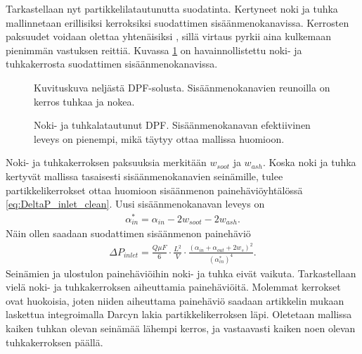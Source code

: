 Tarkastellaan nyt partikkelilatautunutta suodatinta.
Kertyneet noki ja tuhka mallinnetaan erillisiksi kerroksiksi suodattimen sisäänmenokanavissa. Kerrosten paksuudet voidaan  olettaa yhtenäisiksi \cite{Konstandopoulos2000}, sillä virtaus pyrkii aina kulkemaan pienimmän vastuksen reittiä. Kuvassa \ref{fig:hac_dpf_loaded} on havainnollistettu noki- ja tuhkakerrosta suodattimen sisäänmenokanavissa.
\begin{figure}[H]
    \centering 
               {Kuvituskuva neljästä DPF-solusta. Sisäänmenokanavien reunoilla on kerros tuhkaa ja nokea.}
    \caption{Noki- ja tuhkalatautunut DPF. Sisäänmenokanavan efektiivinen leveys on pienempi, mikä täytyy ottaa mallissa huomioon.}
    \label{fig:hac_dpf_loaded}
\end{figure}
Noki- ja tuhkakerroksen paksuuksia merkitään \(w_{soot}\) ja \(w_{ash}\).
Koska noki ja tuhka kertyvät mallissa tasaisesti sisäänmenokanavien seinämille, tulee partikkelikerrokset ottaa huomioon sisäänmenon painehäviöyhtälössä \eqref{eq:DeltaP_inlet_clean}. Uusi sisäänmenokanavan leveys on 
\begin{align}
    \alpha_{in}^* = \alpha_{in} -2w_{soot}-2w_{ash}.
\end{align}
Näin ollen saadaan suodattimen sisäänmenon painehäviö
\begin{align}
    \Delta P_{inlet} = \frac{Q \mu F}{6}\cdot \frac{L^2}{V} \cdot \frac{(\alpha_{in}+\alpha_{out}+2 w_s)^2}{(\alpha_{in}^*)^4}.
    \label{eq:PDinletchannel}
\end{align}
Seinämien ja ulostulon painehäviöihin noki- ja tuhka eivät vaikuta. 
Tarkastellaan vielä noki- ja tuhkakerroksen aiheuttamia painehäviöitä. Molemmat kerrokset ovat huokoisia, joten niiden aiheuttama painehäviö saadaan artikkelin \cite{Konstandopoulos2000} mukaan laskettua integroimalla Darcyn lakia partikkelikerroksen läpi. Oletetaan mallissa kaiken tuhkan olevan seinämää lähempi kerros, ja vastaavasti kaiken noen olevan tuhkakerroksen päällä.
